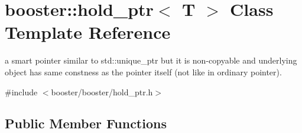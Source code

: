 \section{booster\+:\+:hold\+\_\+ptr$<$ T $>$ Class Template Reference}
\label{classbooster_1_1hold__ptr}


a smart pointer similar to std\+::unique\+\_\+ptr but it is non-\/copyable and underlying object has same constness as the pointer itself (not like in ordinary pointer).  




{\ttfamily \#include $<$booster/booster/hold\+\_\+ptr.\+h$>$}

\subsection*{Public Member Functions}
